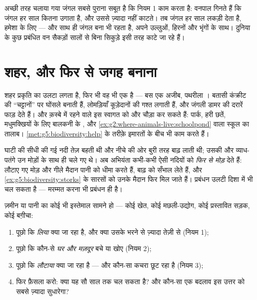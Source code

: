 \begin{example}[वनपाल का हिसाब]\label{ex:g5:people-and-nature:forester}
अच्छी तरह चलाया गया जंगल सबसे पुराना सबूत है कि नियम 1 काम करता है:
वनपाल गिनते हैं कि जंगल हर साल कितना उगाता है, और उससे ज़्यादा नहीं
काटते। तब जंगल हर साल लकड़ी देता है, हमेशा के लिए --- और साथ ही जंगल
बना भी रहता है, अपने उल्लुओं, हिरनों और भृंगों के साथ। दुनिया के कुछ
प्रबंधित वन सैकड़ों सालों से बिना सिकुड़े इसी तरह काटे जा रहे हैं।
\end{example}

\section{शहर, और फिर से जगह बनाना}

\begin{example}[क़स्बे में प्रकृति]\label{ex:g5:people-and-nature:city}
शहर प्रकृति का उलटा लगता है, फिर भी वह भी एक  है --- बस एक अजीब,
पथरीला । बतासी कंक्रीट की ``चट्टानों'' पर घोंसले बनाती हैं,
लोमड़ियाँ कूड़ेदानों की गश्त लगाती हैं, और जंगली  डामर की दरारें
फाड़ देते हैं। और क़स्बे में रहने वाले इस स्वागत को और चौड़ा कर सकते हैं:
पार्क, हरी छतें, मधुमक्खियों के लिए बालकनी के , और
\cref{ex:g2:where-animals-live:schoolpond} वाला स्कूल का तालाब।
\cref{met:g5:biodiversity:help} के तरीक़े इमारतों के बीच भी काम करते
हैं।
\end{example}

\begin{example}[नदी को उसके मोड़ लौटाना]\label{ex:g5:people-and-nature:river}
घाटी की सीधी की गई नदी तेज़ बहती थी और नीचे की ओर बुरी तरह बाढ़ लाती
थी; उसकी  और व्याध-पतंगे उन मोड़ों के साथ ही चले गए थे। अब
अभियंता कभी-कभी ऐसी नदियों को \emph{फिर से मोड़} देते हैं: लौटाए गए
मोड़ और गीले मैदान पानी को धीमा करते हैं, बाढ़ को सँभाल लेते हैं, और
\cref{ex:g5:biodiversity:storks} के सारसों को उनके मैदान फिर मिल जाते
हैं। प्रबंधन उलटी दिशा में भी चल सकता है --- मरम्मत करना भी प्रबंधन ही
है।
\end{example}

\begin{method}[प्रकृति के किसी इस्तेमाल को परखना]\label{met:g5:people-and-nature:judge}
ज़मीन या पानी का कोई भी इस्तेमाल सामने हो --- कोई खेत, कोई मछली-उद्योग,
कोई प्रस्तावित सड़क, कोई बग़ीचा:
\begin{enumerate}
  \item पूछो कि \emph{लिया} क्या जा रहा है, और क्या उसके भरने से
        ज़्यादा तेज़ी से (नियम 1);
  \item पूछो कि कौन-से \emph{घर और मज़दूर} बचे या खोए (नियम 2);
  \item पूछो कि \emph{लौटाया} क्या जा रहा है --- और कौन-सा कचरा छूट
        रहा है (नियम 3);
  \item फिर फ़ैसला करो: क्या यह सौ साल तक चल सकता है? और कौन-सा एक
        बदलाव इस उत्तर को सबसे ज़्यादा सुधारेगा?
\end{enumerate}
\end{method}

